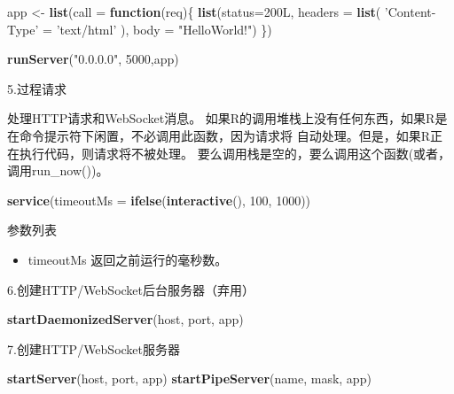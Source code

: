 \documentclass[]{book}
\newenvironment{Shaded}{\begin{snugshade}}{\end{snugshade}}
\newcommand{\KeywordTok}[1]{\textcolor[rgb]{0.13,0.29,0.53}{\textbf{#1}}}
\newcommand{\DataTypeTok}[1]{\textcolor[rgb]{0.13,0.29,0.53}{#1}}
\newcommand{\DecValTok}[1]{\textcolor[rgb]{0.00,0.00,0.81}{#1}}
\newcommand{\StringTok}[1]{\textcolor[rgb]{0.31,0.60,0.02}{#1}}
\newcommand{\ControlFlowTok}[1]{\textcolor[rgb]{0.13,0.29,0.53}{\textbf{#1}}}
\newcommand{\NormalTok}[1]{#1}
\providecommand{\tightlist}{%
  \setlength{\itemsep}{0pt}\setlength{\parskip}{0pt}}
\begin{document}
\begin{Shaded}
\begin{Highlighting}[]
\NormalTok{app <-}\StringTok{ }\KeywordTok{list}\NormalTok{(}\DataTypeTok{call =} \ControlFlowTok{function}\NormalTok{(req)\{}
  \KeywordTok{list}\NormalTok{(}\DataTypeTok{status=}\NormalTok{200L,}
       \DataTypeTok{headers =} \KeywordTok{list}\NormalTok{(}
         \StringTok{'Content-Type'}\NormalTok{ =}\StringTok{ 'text/html'}
\NormalTok{       ),}
       \DataTypeTok{body =} \StringTok{"HelloWorld!"}\NormalTok{)}
\NormalTok{\})}

\KeywordTok{runServer}\NormalTok{(}\StringTok{"0.0.0.0"}\NormalTok{, }\DecValTok{5000}\NormalTok{,app)}
\end{Highlighting}
\end{Shaded}

5.过程请求

处理HTTP请求和WebSocket消息。 如果R的调用堆栈上没有任何东西，如果R是
在命令提示符下闲置，不必调用此函数，因为请求将
自动处理。但是，如果R正在执行代码，则请求将不被处理。
要么调用栈是空的，要么调用这个函数(或者，调用run\_now())。

\begin{Shaded}
\begin{Highlighting}[]
\KeywordTok{service}\NormalTok{(}\DataTypeTok{timeoutMs =} \KeywordTok{ifelse}\NormalTok{(}\KeywordTok{interactive}\NormalTok{(), }\DecValTok{100}\NormalTok{, }\DecValTok{1000}\NormalTok{))}
\end{Highlighting}
\end{Shaded}

参数列表

\begin{itemize}
\tightlist
\item
  timeoutMs 返回之前运行的毫秒数。
\end{itemize}

6.创建HTTP/WebSocket后台服务器（弃用）

\begin{Shaded}
\begin{Highlighting}[]
\KeywordTok{startDaemonizedServer}\NormalTok{(host, port, app)}
\end{Highlighting}
\end{Shaded}

7.创建HTTP/WebSocket服务器

\begin{Shaded}
\begin{Highlighting}[]
\KeywordTok{startServer}\NormalTok{(host, port, app)}
\KeywordTok{startPipeServer}\NormalTok{(name, mask, app)}
\end{Highlighting}
\end{Shaded}
\end{document}
